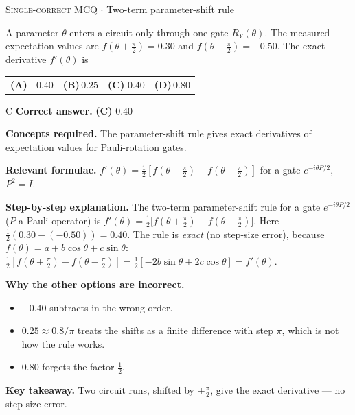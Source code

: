 \documentclass[11pt,a4paper]{article}
\newcommand{\optlabel}[1]{\textbf{(#1)}}
\newcommand{\correctlabel}[1]{\textcolor{okgreen}{\textbf{(#1)}\,\ding{51}}}
\newenvironment{qitem}[1]{\begin{list}{}{\setlength{\leftmargin}{3.3em}\setlength{\labelwidth}{3.1em}%
  \setlength{\labelsep}{0.2em}\setlength{\topsep}{3pt}\setlength{\parsep}{3pt}}\item[\textbf{Q.#1}\hfill]}{\end{list}}
\newcommand{\qsep}{\par\vspace{2pt}{\color{black!15}\hrule}\vspace{4pt}}
\newcommand{\qmeta}[2]{{\footnotesize\color{black!60}\textsc{#1} \;$\cdot$\; #2}\par}
\begin{document}
\begin{qitem}{47}
\qmeta{Single-correct MCQ}{Two-term parameter-shift rule}
A parameter $\theta$ enters a circuit only through one gate $R_Y(\theta)$. The measured expectation values are
$f(\theta + \frac\pi2) = 0.30$ and $f(\theta - \frac\pi2) = -0.50$. The exact derivative $f'(\theta)$ is
\par\smallskip\noindent\begin{tabularx}{\linewidth}{@{}*{4}{L}@{}}
\optlabel{A}\,$-0.40$ & \optlabel{B}\,$0.25$ & \correctlabel{C}\,$0.40$ & \optlabel{D}\,$0.80$
\end{tabularx}
\end{qitem}
\begin{solbox}{C}
\textbf{\color{brand}Correct answer.} \textcolor{okgreen}{\textbf{(C)}} $0.40$

\textbf{\color{brand}Concepts required.} The parameter-shift rule gives exact derivatives of expectation values for Pauli-rotation gates.

\textbf{\color{brand}Relevant formulae.} $f'(\theta) = \frac12[f(\theta + \frac\pi2) - f(\theta - \frac\pi2)]$ for a gate $e^{-i\theta P/2}$, $P^2 = I$.

\textbf{\color{brand}Step-by-step explanation.} The two-term parameter-shift rule for a gate $e^{-i\theta P/2}$ ($P$ a Pauli operator) is
$f'(\theta) = \frac12\big[f(\theta + \frac\pi2) - f(\theta - \frac\pi2)\big]$. Here $\frac12(0.30 - (-0.50)) = 0.40$.
The rule is \emph{exact} (no step-size error), because $f(\theta) = a + b\cos\theta + c\sin\theta$:
$\frac12[f(\theta + \frac\pi2) - f(\theta - \frac\pi2)] = \frac12[-2b\sin\theta + 2c\cos\theta] = f'(\theta)$.

\textbf{\color{brand}Why the other options are incorrect.}
\begin{itemize}[leftmargin=2.4em, itemsep=1pt, topsep=2pt]
\item[\textbf{(A)}] $-0.40$ subtracts in the wrong order.
\item[\textbf{(B)}] $0.25 \approx 0.8/\pi$ treats the shifts as a finite difference with step $\pi$, which is not how the rule works.
\item[\textbf{(D)}] $0.80$ forgets the factor $\frac12$.
\end{itemize}
\textbf{\color{brand}Key takeaway.} Two circuit runs, shifted by $\pm\frac\pi2$, give the exact derivative --- no step-size error.
\end{solbox}
\qsep
\end{document}

